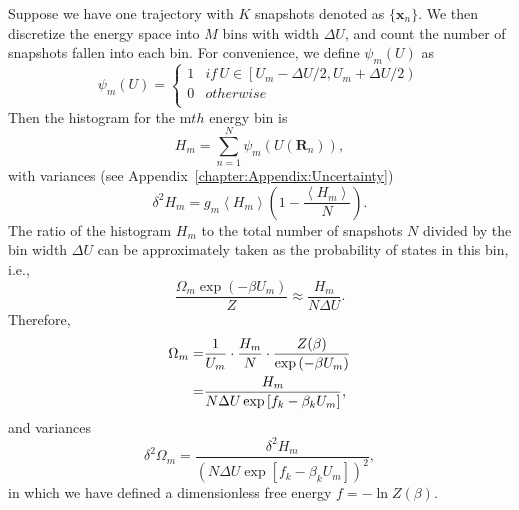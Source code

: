 Suppose we have one trajectory with $K$ snapshots denoted as $\{\mathbf{x}_n\}$. We then discretize the energy space into $M$ bins with width $\Delta U$, and count the number of snapshots fallen into each bin. For convenience, we define $\psi_m(U)$ as
\begin{equation}
	\psi_m(U)= 
	\left\{ 
	\begin{array}{rl} 
	1 & if\,U\in \left[ U_m-\Delta U/2, U_m+\Delta U/2\right)\\ 
	0 & otherwise\\  
	\end{array} 
	\right. 
\end{equation}
Then the histogram for the m$\mathit{th}$ energy bin is
\begin{equation}
	H_{m}=\sum\limits_{n=1}^{N}\psi_{m}(U(\mathbf{R}_n)),
\end{equation}
with variances (see Appendix~\ref{chapter:Appendix:Uncertainty})
\begin{equation}
	\delta^2 H_m=g_m\left<H_m\right>\left(1-\frac{\left<H_m\right>}{N}\right).
\end{equation}
The ratio of the histogram $H_m$ to the total number of snapshots $N$ divided by the bin width $\Delta U$ can be approximately taken as the probability of states in this bin, i.e.,
\begin{equation}
	\frac{\Omega_m\exp{(-\beta U_m)}}{Z}\approx\frac{H_m}{N\Delta U}.
\end{equation}
Therefore,
\begin{align}
	\Omega_m=&\frac{1}{U_m}\cdot\frac{H_m}{N}\cdot\frac{Z(\beta)}{\exp{(-\beta U_m)}}\notag\\
	        =&\frac{H_m}{N\Delta U\exp{\left[f_k-\beta_kU_m\right]}},
	\label{Eq:FEM:WHAM:DoSsingle}
\end{align}
and variances
\begin{equation}
	\delta^2\Omega_m=\frac{\delta^2 H_m}{\left(N\Delta U\exp{\left[f_k-\beta_kU_m\right]}\right)^2},
\end{equation}
in which we have defined a dimensionless free energy $f=-\ln{Z(\beta)}$.

